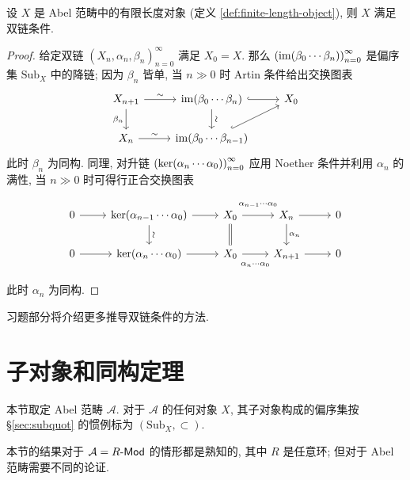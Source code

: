 \begin{proposition}
	设 $X$ 是 Abel 范畴中的有限长度对象 (定义 \ref{def:finite-length-object}), 则 $X$ 满足双链条件.
\end{proposition}
\begin{proof}
	给定双链 $(X_n, \alpha_n, \beta_n)_{n=0}^\infty$ 满足 $X_0 = X$. 那么 $\left( \operatorname{im}(\beta_0 \cdots \beta_n) \right)_{n=0}^\infty$ 是偏序集 $\mathrm{Sub}_X$ 中的降链; 因为 $\beta_n$ 皆单, 当 $n \gg 0$ 时 Artin 条件给出交换图表
	\[\begin{tikzcd}
		X_{n+1} \arrow[d, "\beta_n"'] \arrow[r, "\sim"] & \Image(\beta_0 \cdots \beta_n) \arrow[d, "\sim" sloped] \arrow[hookrightarrow, r] & X_0 \\
		X_n \arrow[r, "\sim"] & \Image(\beta_0 \cdots \beta_{n-1}) \arrow[hookrightarrow, ru] &
	\end{tikzcd}\]
	此时 $\beta_n$ 为同构. 同理, 对升链 $\left( \operatorname{ker}(\alpha_n \cdots \alpha_0) \right)_{n=0}^\infty$ 应用 Noether 条件并利用 $\alpha_n$ 的满性, 当 $n \gg 0$ 时可得行正合交换图表
	\[\begin{tikzcd}
		0 \arrow[r] & \Ker(\alpha_{n-1} \cdots \alpha_0) \arrow[d, "\sim" sloped] \arrow[r] & X_0 \arrow[r, "{\alpha_{n-1} \cdots \alpha_0}" inner sep=0.7em] \arrow[equal, d] & X_n \arrow[d, "{\alpha_n}"] \arrow[r] & 0 \\
		0 \arrow[r] & \Ker(\alpha_n \cdots \alpha_0) \arrow[r] & X_0 \arrow[r, "{\alpha_n \cdots \alpha_0}"' inner sep=0.7em] & X_{n+1} \arrow[r] & 0
	\end{tikzcd}\]
	此时 $\alpha_n$ 为同构.
\end{proof}

习题部分将介绍更多推导双链条件的方法.

\section{子对象和同构定理}\label{sec:Abel-cat-subobjects}
本节取定 Abel 范畴 $\mathcal{A}$. 对于 $\mathcal{A}$ 的任何对象 $X$, 其子对象构成的偏序集按 \S\ref{sec:subquot} 的惯例标为 $(\mathrm{Sub}_X, \subset)$.

本节的结果对于 $\mathcal{A} = R\text{-}\mathsf{Mod}$ 的情形都是熟知的, 其中 $R$ 是任意环; 但对于 Abel 范畴需要不同的论证.

